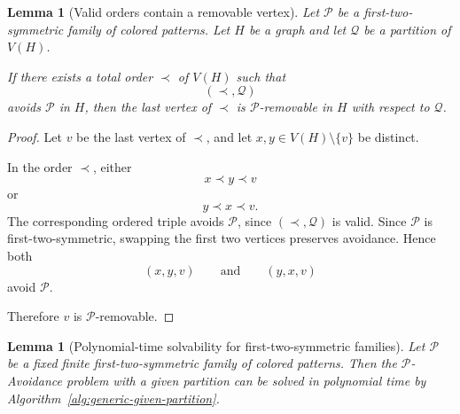 \documentclass[12pt]{article}
\theoremstyle{plain}
\newtheorem{lemma}[theorem]{Lemma}
\theoremstyle{definition}
\theoremstyle{remark}
\theoremstyle{definition}
\begin{document}
\begin{lemma}[Valid orders contain a removable vertex]
\label{lem:first-two-symmetric-removable}
Let \(\mathcal P\) be a first-two-symmetric family of colored patterns.
Let \(H\) be a graph and let \(\mathcal Q\) be a partition of \(V(H)\).

If there exists a total order \(\prec\) of \(V(H)\) such that
\[
(\prec,\mathcal Q)
\]
avoids \(\mathcal P\) in \(H\), then the last vertex of \(\prec\) is
\(\mathcal P\)-removable in \(H\) with respect to \(\mathcal Q\).
\end{lemma}

\begin{proof}
Let \(v\) be the last vertex of \(\prec\), and let
\(x,y\in V(H)\setminus\{v\}\) be distinct.

In the order \(\prec\), either
\[
x\prec y\prec v
\]
or
\[
y\prec x\prec v.
\]
The corresponding ordered triple avoids \(\mathcal P\), since
\((\prec,\mathcal Q)\) is valid. Since \(\mathcal P\) is
first-two-symmetric, swapping the first two vertices preserves avoidance.
Hence both
\[
(x,y,v)
\qquad\text{and}\qquad
(y,x,v)
\]
avoid \(\mathcal P\).

Therefore \(v\) is \(\mathcal P\)-removable.
\end{proof}




\begin{lemma}[Polynomial-time solvability for first-two-symmetric families]
\label{lem:first-two-symmetric-given-partition}
Let \(\mathcal P\) be a fixed finite first-two-symmetric family of colored
patterns. Then the \(\mathcal P\)-Avoidance problem with a given partition
can be solved in polynomial time by
Algorithm~\ref{alg:generic-given-partition}.
\end{lemma}
\end{document}
